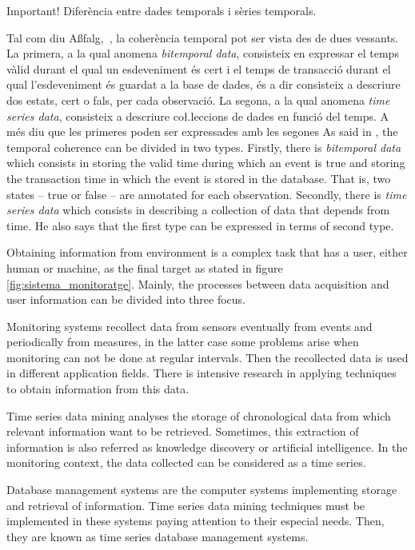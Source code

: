 Important! Diferència entre dades temporals i sèries temporals.

Tal com diu A{\ss}falg,~\cite{assfalg08:thesis}, la coherència temporal pot ser vista des de dues vessants. La primera, a la qual anomena \emph{bitemporal data}, consisteix en expressar el temps vàlid durant el qual un esdeveniment és cert i el temps de transacció durant el qual l'esdeveniment és guardat a la base de dades, és a dir consisteix a descriure dos estats, cert o fals, per cada observació. La segona, a la qual anomena \emph{time series data}, consisteix a descriure co\l.leccions de dades en funció del temps. A més diu que les primeres poden ser expressades amb les segones
As said in \textcite{assfalg08:thesis}, the temporal coherence can be divided in two types. Firstly, there is  \emph{bitemporal data} which consists in storing the valid time during which an event is true and storing the transaction time in which the event is stored in the database. That is, two states -- true or false -- are annotated for each observation.  Secondly, there is \emph{time series data} which consists in describing a collection of data that depends from time. He also says that the first type can be expressed in terms of second type.


Obtaining information from environment is a complex task that has a user, either human or machine, as the final target as stated in figure \ref{fig:sistema_monitoratge}.
 Mainly, the processes between data acquisition and user information can be divided into three focus.


Monitoring systems recollect data from sensors eventually from events and periodically from measures, in the latter case some problems arise when monitoring can not be done at regular intervals. Then the recollected data is used in different application fields. There is intensive research in applying techniques to obtain information from this data.

Time series data mining analyses the storage of chronological data from which relevant information want to be retrieved. Sometimes, this extraction of information is also referred as knowledge discovery or artificial intelligence.
In the monitoring context, the data collected can be considered as a time series.

Database management systems are the computer systems implementing storage and retrieval of information. Time series data mining techniques must be implemented in these systems paying attention to their especial needs. Then, they are known as time series database management systems.








